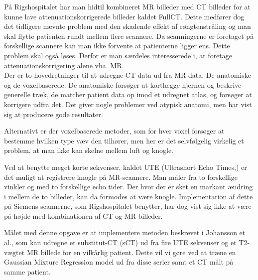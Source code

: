På Rigshospitalet har man hidtil kombineret MR billeder med CT
billeder for at kunne lave attenuationskorrigerede billeder kaldet FullCT.
Dette medfører dog det tidligere nævnte problem med den skadende
effekt af røngtenstråling og man skal flytte patienten rundt mellem
flere scannere. Da scanningerne er foretaget på forskellige scannere
kan man ikke forvente at patienterne ligger ens. Dette problem skal
også løses. Derfor er man særdeles interesserede i, at foretage
attenuationskorrigering alene vha. MR. \\

Der er to hovedretninger til at udregne CT data ud fra MR data. De
anatomiske og de voxelbaserede. De anatomiske forsøger at kortlægge
hjernen og beskrive generelle træk, de matcher patient data op imod et
udregnet atlas, og forsøger at korrigere udfra det. Det giver nogle
problemer ved atypisk anatomi, men har vist sig at producere gode
resultater.

Alternativt er der voxelbaserede metoder, som for hver voxel forsøger
at bestemme hvilken type væv den tilhører, men her er det selvfølgelig
virkelig et problem, at man ikke kan skelne mellem luft og knogle.

Ved at benytte meget korte sekvenser, kaldet UTE (Ultrashort Echo Times,)
er det muligt at registrere knogle på MR-scannere. Man måler fra to
forskellige vinkler og med to forskellige echo tider. Der hvor der er
sket en markant ændring i mellem de to billeder, kan da formodes at
være knogle. Implementation af dette på Siemens scannerne, som
Rigshospitalet benytter, har dog vist sig ikke at være på højde med
kombinationen af CT og MR billeder.

Målet med denne opgave er at implementere metoden beskrevet i
Johansson et al., som kan udregne et substitut-CT (sCT) ud fra fire
UTE sekvenser og et T2-vægtet MR billede for en vilkårlig patient. Dette
vil vi gøre ved at træne en Gaussian Mixture Regression model ud fra
disse serier samt et CT målt på samme patient.
